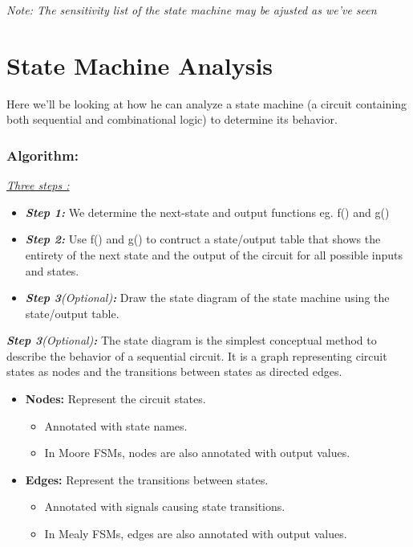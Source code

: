 \documentclass[12pt,openany]{book}
\begin{document}
\textit{Note: The sensitivity list of the state machine may be ajusted as we've seen}

\newpage
\section{State Machine Analysis}
Here we'll be looking at how he can analyze a state machine (a circuit containing both sequential and combinational logic) to determine its behavior.
\subsubsection{Algorithm:}
\hspace*{20px}
\begin{minipage}{0.88\textwidth}
	\underline{\textit{Three steps :}}
	\begin{itemize}
		\item[] \textbf{\textit{Step 1:}} We determine the next-state and output functions eg. f() and g()
		\item[] \textbf{\textit{Step 2:}} Use f() and g() to contruct a state/output table that shows the entirety of the next state and the output of the circuit for all possible inputs and states.
		\item[] \textbf{\textit{Step 3}}\textit{(Optional)}\textbf{\textit{:}} Draw the state diagram of the state machine using the state/output table.
	\end{itemize}
\end{minipage}
\newline
\vspace*{10px}

\textbf{\textit{Step 3}}\textit{(Optional)}\textbf{\textit{:}}
The state diagram is the simplest conceptual method to describe the behavior of a sequential circuit. It is a graph representing circuit states as nodes and the transitions between states as directed edges.

\begin{itemize}
    \item \textbf{Nodes:} Represent the circuit states.
    \begin{itemize}
        \item Annotated with state names.
        \item In Moore FSMs, nodes are also annotated with output values.
    \end{itemize}
    \item \textbf{Edges:} Represent the transitions between states.
    \begin{itemize}
        \item Annotated with signals causing state transitions.
        \item In Mealy FSMs, edges are also annotated with output values.
    \end{itemize}
\end{itemize}
\end{document}
